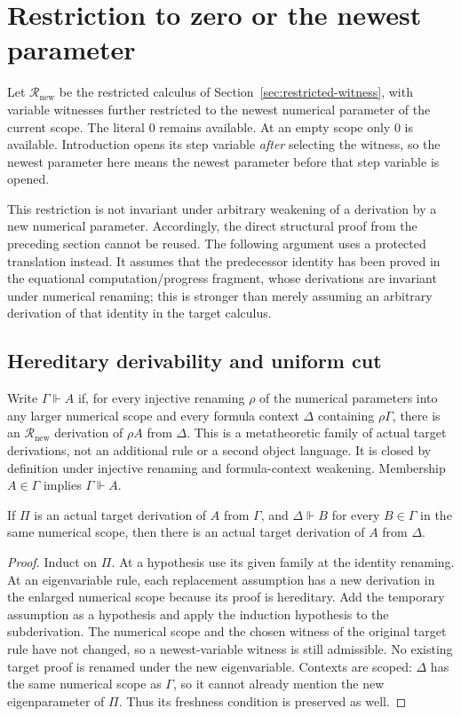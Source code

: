 \section{Restriction to zero or the newest parameter}
\label{sec:newest-witness}

Let $\mathcal R_{\mathrm{new}}$ be the restricted calculus of
Section~\ref{sec:restricted-witness}, with variable witnesses further
restricted to the newest numerical parameter of the current scope.
The literal $0$ remains available.  At an empty scope only $0$ is
available.  Introduction opens its step variable \emph{after} selecting
the witness, so the newest parameter here means the newest parameter
before that step variable is opened.

This restriction is not invariant under arbitrary weakening of a
derivation by a new numerical parameter.  Accordingly, the direct
structural proof from the preceding section cannot be reused.  The
following argument uses a protected translation instead.  It assumes
that the predecessor identity has been proved in the equational
computation/progress fragment, whose derivations are invariant under
numerical renaming; this is stronger than merely assuming an arbitrary
derivation of that identity in the target calculus.

\subsection{Hereditary derivability and uniform cut}

Write $\Gamma\Vdash A$ if, for every injective renaming $\rho$ of the
numerical parameters into any larger numerical scope and every
formula context $\Delta$ containing $\rho\Gamma$, there is an
$\mathcal R_{\mathrm{new}}$ derivation of $\rho A$ from $\Delta$.
This is a metatheoretic family of actual target derivations, not an
additional rule or a second object language.  It is closed by definition
under injective renaming and formula-context weakening.  Membership
$A\in\Gamma$ implies $\Gamma\Vdash A$.

\begin{lemma}
If $\Pi$ is an actual target derivation of $A$ from $\Gamma$, and
$\Delta\Vdash B$ for every $B\in\Gamma$ in the same numerical scope,
then there is an actual target derivation of $A$ from $\Delta$.
\end{lemma}
\begin{proof}
Induct on $\Pi$.  At a hypothesis use its given family at the identity
renaming.  At an eigenvariable rule, each replacement assumption has
a new derivation in the enlarged numerical scope because its proof is
hereditary.  Add the temporary assumption as a hypothesis and apply the
induction hypothesis to the subderivation.  The numerical scope and the
chosen witness of the original target rule have not changed, so a
newest-variable witness is still admissible.  No existing target proof
is renamed under the new eigenvariable.  Contexts are scoped: $\Delta$
has the same numerical scope as $\Gamma$, so it cannot already mention
the new eigenparameter of $\Pi$.  Thus its freshness condition is
preserved as well.
\end{proof}

